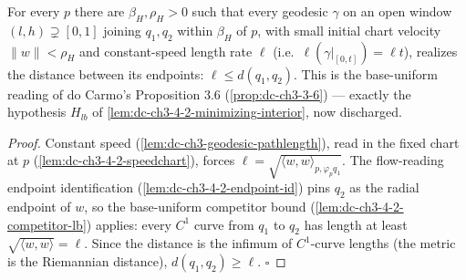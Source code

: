 \begin{lemma}
  \label{lem:dc-ch3-4-2-lowerbound}
  \leanok
  For every $p$ there are $\beta_H,\rho_H>0$ such that every geodesic $\gamma$ on an open window
  $(l,h)\supsetneq[0,1]$ joining $q_1,q_2$ within $\beta_H$ of $p$, with small initial chart velocity
  $\|w\|<\rho_H$ and constant-speed length rate $\ell$ (i.e.\ $\ell(\gamma|_{[0,t]})=\ell t$), realizes
  the distance between its endpoints: $\ell\le d(q_1,q_2)$. This is the base-uniform reading of do
  Carmo's Proposition 3.6 (\cref{prop:dc-ch3-3-6}) --- exactly the hypothesis $H_{lb}$ of
  \cref{lem:dc-ch3-4-2-minimizing-interior}, now discharged.
\end{lemma}
\begin{proof}
  \leanok
  Constant speed (\cref{lem:dc-ch3-geodesic-pathlength}), read in the fixed chart at $p$
  (\cref{lem:dc-ch3-4-2-speedchart}), forces $\ell=\sqrt{\langle w,w\rangle_{p,\varphi_p q_1}}$. The
  flow-reading endpoint identification (\cref{lem:dc-ch3-4-2-endpoint-id}) pins $q_2$ as the radial
  endpoint of $w$, so the base-uniform competitor bound (\cref{lem:dc-ch3-4-2-competitor-lb}) applies:
  every $C^1$ curve from $q_1$ to $q_2$ has length at least $\sqrt{\langle w,w\rangle}=\ell$. Since the
  distance is the infimum of $C^1$-curve lengths (the metric is the Riemannian distance),
  $d(q_1,q_2)\ge\ell$. $\square$
\end{proof}

